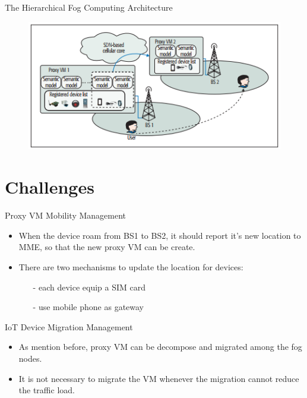 \documentclass{beamer}
\begin{document}
\begin{frame} {The Hierarchical Fog Computing Architecture} 
    \begin{figure}[t]
        \centering
        \includegraphics[width=1.1\textwidth]{figures/5.png}
        
    \end{figure}
\end{frame}


\section{Challenges}
\begin{frame} {Proxy VM Mobility Management}
    \begin{itemize}
        \item {When the device roam from BS1 to BS2, it should report it's new location to MME, so that the new proxy VM can be create.}
        \item {There are two mechanisms to update the location for devices:}
        \begin{itemize}
        \item [-]{each device equip a {SIM} card }
        \item [-]{use mobile phone as gateway}
        \end{itemize} 
    \end{itemize}
\end{frame}

\begin{frame} {{IoT} Device Migration Management}
    \begin{itemize}
        \item {As mention before, proxy VM can be decompose and migrated among the fog nodes.}
        \item {It is not necessary to migrate the VM whenever the migration cannot reduce the traffic load.}
    \end{itemize}
\end{frame}
\end{document}
